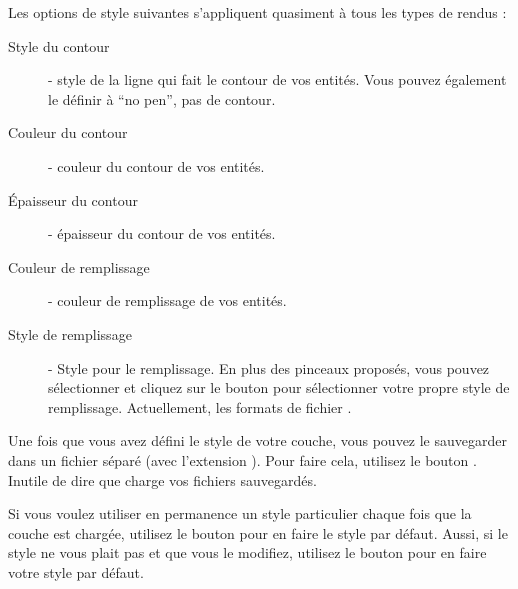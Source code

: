 Les options de style suivantes s'appliquent quasiment à tous les types de rendus :
\begin{description}
\item[Style du contour] - style de la ligne qui fait le contour de vos entités. Vous pouvez également le définir à ``no pen'', pas de contour.
\item[Couleur du contour] - couleur du contour de vos entités.
\item[Épaisseur du contour] - épaisseur du contour de vos entités.
\item[Couleur de remplissage] - couleur de remplissage de vos entités.
\item[Style de remplissage] - Style pour le remplissage. En plus des pinceaux proposés, vous pouvez sélectionner  et cliquez sur le \browsebutton bouton pour sélectionner votre propre style de remplissage. Actuellement, les formats de fichier .
\end{description}

Une fois que vous avez défini le style de votre couche, vous pouvez le sauvegarder dans un fichier séparé (avec l'extension ). Pour faire cela, utilisez le bouton . Inutile de dire que  charge vos fichiers sauvegardés.

Si vous voulez utiliser en permanence un style particulier chaque fois que la couche est chargée, utilisez le bouton  pour en faire le style par défaut. Aussi, si le style ne vous plait pas et que vous le modifiez, utilisez le bouton  pour en faire votre style par défaut.

